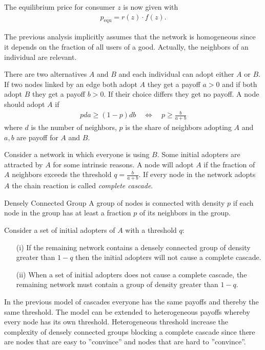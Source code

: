 \documentclass[english]{panikzettel}
\begin{document}
The equilibrium price for consumer $ z $ is now given with
\begin{align*}
	p_\text{equ} = r(z) \cdot f(z).
\end{align*}


The previous analysis implicitly assumes that the network is homogeneous since it depends on the fraction of all users of a good.
Actually, the neighbors of an individual are relevant.

There are two alternatives $ A $ and $ B $ and each individual can adopt either $ A $ or $ B $.
If two nodes linked by an edge both adopt $ A $ they get a payoff $ a > 0 $ and if both adopt $ B $ they get a payoff $ b > 0 $.
If their choice differs they get no payoff. A node should adopt $ A $ if
\begin{align*}
	pda \geq (1 - p)db \quad\Leftrightarrow\quad p \geq \frac{b}{a + b}
\end{align*}
where $ d $ is the number of neighbors, $ p $ is the share of neighbors adopting $ A $ and $ a,b $ are payoff for $ A $ and $ B $.

Consider a network in which everyone is using $ B $.
Some initial adopters are attracted by $ A $ for some intrinsic reasons.
A node will adopt $ A $ if the fraction of $ A $ neighbors exceeds the threshold $ q = \frac{b}{a + b} $.
If every node in the network adopts $ A $ the chain reaction is called \emph{complete cascade}.


\begin{defi}{Densely Connected Group}
A group of nodes is connected with density $ p $ if each node in the group has at least a fraction $ p $ of its neighbors in the group.
\end{defi}

Consider a set of initial adopters of $ A $ with a threshold $ q $:
\begin{itemize}
	\item[(i)] If the remaining network contains a densely connected group of density greater than $ 1 - q $ then the initial adopters will not cause a complete cascade.
	\item[(ii)] When a set of initial adopters does not cause a complete cascade, the remaining network must contain a group of density greater than $ 1 - q $.
\end{itemize}

In the previous model of cascades everyone has the same payoffs and thereby the same threshold.
The model can be extended to heterogeneous payoffs whereby every node has its own threshold.
Heterogeneous threshold increase the complexity of densely connected groups blocking a complete cascade since there are nodes that are easy to ''convince'' and nodes that are hard to ''convince''.
\end{document}
